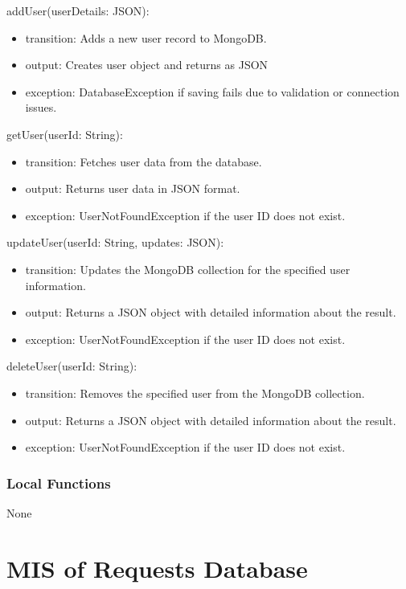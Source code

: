 \documentclass[12pt, titlepage]{article}
\begin{document}
\noindent addUser(userDetails: JSON):
\begin{itemize}
  \item transition: Adds a new user record to MongoDB.
  \item output: Creates user object and returns as JSON
  \item exception: DatabaseException if saving fails due to validation or connection issues.
\end{itemize}

\noindent getUser(userId: String):
\begin{itemize}
  \item transition: Fetches user data from the database.
  \item output: Returns user data in JSON format.
  \item exception: UserNotFoundException if the user ID does not exist.
\end{itemize}

\noindent updateUser(userId: String, updates: JSON):
\begin{itemize}
  \item transition: Updates the MongoDB collection for the specified user information.
  \item output: Returns a JSON object with detailed information about the result.
  \item exception: UserNotFoundException if the user ID does not exist.
\end{itemize}

\noindent deleteUser(userId: String):
\begin{itemize}
  \item transition: Removes the specified user from the MongoDB collection.
  \item output: Returns a JSON object with detailed information about the result.
  \item exception: UserNotFoundException if the user ID does not exist.
\end{itemize}

\subsubsection{Local Functions}
None

\section{MIS of Requests Database} \label{Requests Database}
\end{document}
